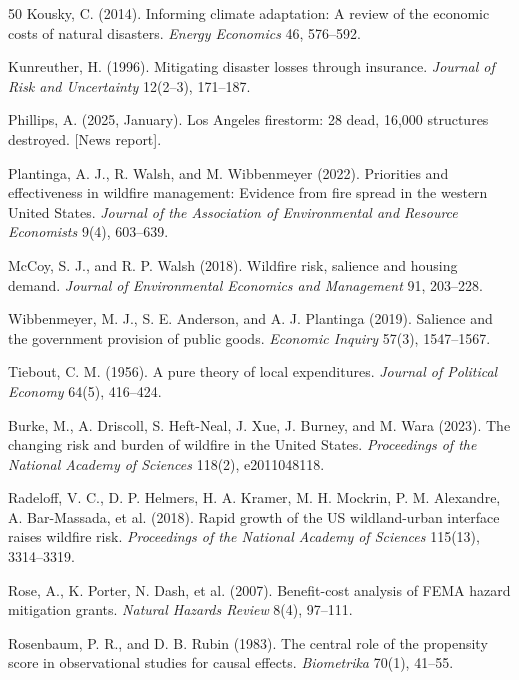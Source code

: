 \documentclass[12pt, letterpaper]{article}
\begin{document}
\begin{thebibliography}{50}
Kousky, C. (2014). Informing climate adaptation: A review of the economic costs of natural disasters. \textit{Energy Economics} 46, 576--592.

Kunreuther, H. (1996). Mitigating disaster losses through insurance. \textit{Journal of Risk and Uncertainty} 12(2--3), 171--187.

Phillips, A. (2025, January). Los Angeles firestorm: 28 dead, 16,000 structures destroyed. [News report].

Plantinga, A. J., R. Walsh, and M. Wibbenmeyer (2022). Priorities and effectiveness in wildfire management: Evidence from fire spread in the western United States. \textit{Journal of the Association of Environmental and Resource Economists} 9(4), 603--639.

McCoy, S. J., and R. P. Walsh (2018). Wildfire risk, salience and housing demand. \textit{Journal of Environmental Economics and Management} 91, 203--228.

Wibbenmeyer, M. J., S. E. Anderson, and A. J. Plantinga (2019). Salience and the government provision of public goods. \textit{Economic Inquiry} 57(3), 1547--1567.

Tiebout, C. M. (1956). A pure theory of local expenditures. \textit{Journal of Political Economy} 64(5), 416--424.

Burke, M., A. Driscoll, S. Heft-Neal, J. Xue, J. Burney, and M. Wara (2023). The changing risk and burden of wildfire in the United States. \textit{Proceedings of the National Academy of Sciences} 118(2), e2011048118.

Radeloff, V. C., D. P. Helmers, H. A. Kramer, M. H. Mockrin, P. M. Alexandre, A. Bar-Massada, et al. (2018). Rapid growth of the US wildland-urban interface raises wildfire risk. \textit{Proceedings of the National Academy of Sciences} 115(13), 3314--3319.

Rose, A., K. Porter, N. Dash, et al. (2007). Benefit-cost analysis of FEMA hazard mitigation grants. \textit{Natural Hazards Review} 8(4), 97--111.

Rosenbaum, P. R., and D. B. Rubin (1983). The central role of the propensity score in observational studies for causal effects. \textit{Biometrika} 70(1), 41--55.


\end{thebibliography}
\end{document}
